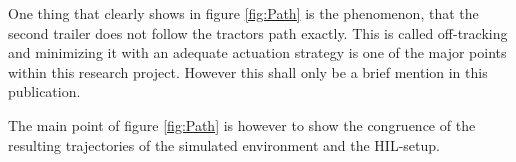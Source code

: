 \documentclass[root.tex]{subfiles}
\begin{document}
	One thing that clearly shows in figure \ref{fig:Path} is the phenomenon, that the second trailer does not follow  the tractors path exactly. This is called off-tracking and minimizing it with an adequate actuation strategy is one of the major points within this research project. However this shall only be a brief mention in this publication. 
	
	The main point of figure \ref{fig:Path} is however to show the congruence of the resulting trajectories of the simulated environment and the \gls{HIL}-setup. 
	
	
	
	
		
	

	
\end{document}
